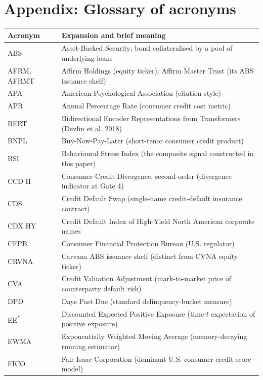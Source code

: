 \documentclass[11pt,a4paper]{article}
\begin{document}
\clearpage

\appendix
\section{Appendix: Glossary of acronyms}

\begin{longtable}{@{}lp{11cm}@{}}
\toprule
\textbf{Acronym} & \textbf{Expansion and brief meaning} \\
\midrule\endhead
ABS         & Asset-Backed Security; bond collateralised by a pool of underlying loans \\
AFRM, AFRMT & Affirm Holdings (equity ticker); Affirm Master Trust (its ABS issuance shelf) \\
APA         & American Psychological Association (citation style) \\
APR         & Annual Percentage Rate (consumer credit cost metric) \\
BERT        & Bidirectional Encoder Representations from Transformers (Devlin et al. 2018) \\
BNPL        & Buy-Now-Pay-Later (short-tenor consumer credit product) \\
BSI         & Behavioural Stress Index (the composite signal constructed in this paper) \\
CCD II      & Consumer-Credit Divergence, second-order (divergence indicator at Gate 4) \\
CDS         & Credit Default Swap (single-name credit-default insurance contract) \\
CDX HY      & Credit Default Index of High-Yield North American corporate names \\
CFPB        & Consumer Financial Protection Bureau (U.S. regulator) \\
CRVNA       & Carvana ABS issuance shelf (distinct from CVNA equity ticker) \\
CVA         & Credit Valuation Adjustment (mark-to-market price of counterparty default risk) \\
DPD         & Days Past Due (standard delinquency-bucket measure) \\
EE\textsuperscript{*} & Discounted Expected Positive Exposure (time-$t$ expectation of positive exposure) \\
EWMA        & Exponentially Weighted Moving Average (memory-decaying running estimator) \\
FICO        & Fair Isaac Corporation (dominant U.S. consumer credit-score model) \\

\end{longtable}
\end{document}

